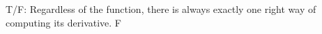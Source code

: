 {T/F: Regardless of the function, there is always exactly one right way of computing its derivative.
}
{F
}
